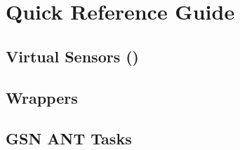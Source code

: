 \graphicspath{{chapters/ch-quickref/figures/}}

\chapter{Quick Reference Guide}

\section{Virtual Sensors (\vs)}

%
%


%
%
%
\newpage
\section{Wrappers \label{sec:quickref_wrappers}}






%
%
\newpage
\section{GSN ANT Tasks \label{quickref_ant_task}}

